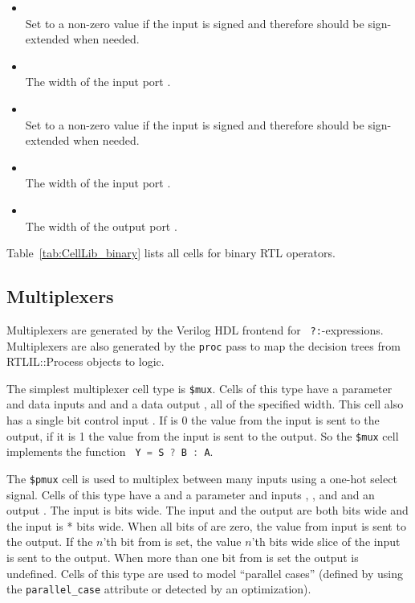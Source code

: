\begin{itemize}
\item {} \\
Set to a non-zero value if the input  is signed and therefore should be sign-extended
when needed.

\item {} \\
The width of the input port .

\item {} \\
Set to a non-zero value if the input  is signed and therefore should be sign-extended
when needed.

\item {} \\
The width of the input port .

\item {} \\
The width of the output port .
\end{itemize}

Table~\ref{tab:CellLib_binary} lists all cells for binary RTL operators.

\subsection{Multiplexers}

Multiplexers are generated by the Verilog HDL frontend for {\tt
?:}-expressions. Multiplexers are also generated by the {\tt proc} pass to map the decision trees
from RTLIL::Process objects to logic.

The simplest multiplexer cell type is {\tt \$mux}. Cells of this type have a  parameter
and data inputs  and  and a data output , all of the specified width. This cell also
has a single bit control input . If  is 0 the value from the  input is sent to
the output, if it is 1 the value from the  input is sent to the output. So the {\tt \$mux}
cell implements the function \lstinline[language=Verilog]; Y = S ? B : A;.

The {\tt \$pmux} cell is used to multiplex between many inputs using a one-hot select signal. Cells
of this type have a  and a  parameter and inputs , , and  and
an output . The  input is  bits wide. The  input and the output are both
 bits wide and the  input is * bits wide. When all bits of
 are zero, the value from  input is sent to the output. If the $n$'th bit from  is
set, the value $n$'th  bits wide slice of the  input is sent to the output. When more
than one bit from  is set the output is undefined. Cells of this type are used to model
``parallel cases'' (defined by using the {\tt parallel\_case} attribute or detected by
an optimization).

